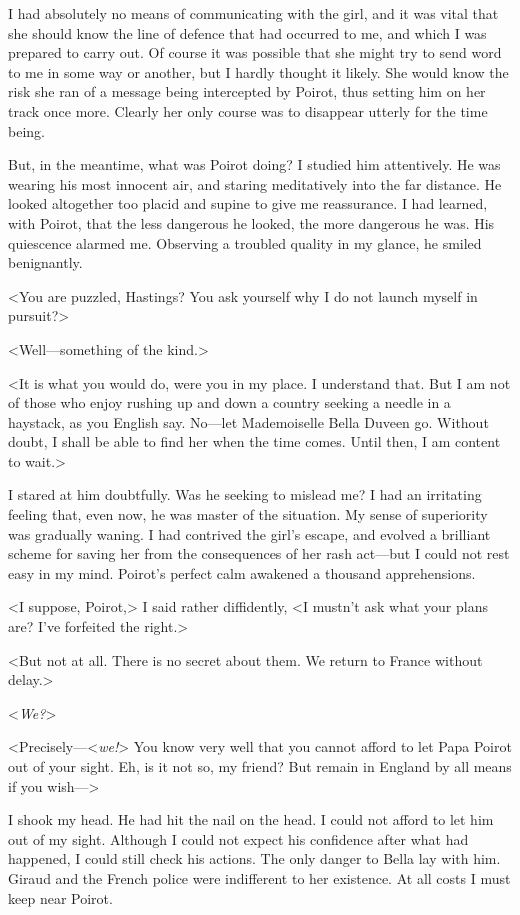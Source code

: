  I had absolutely no means of communicating with the girl, and it was vital that she should know the line of defence that had occurred to me, and which I was prepared to carry out. Of course it was possible that she might try to send word to me in some way or another, but I hardly thought it likely. She would know the risk she ran of a message being intercepted by Poirot, thus setting him on her track once more. Clearly her only course was to disappear utterly for the time being. 

 But, in the meantime, what was Poirot doing? I studied him attentively. He was wearing his most innocent air, and staring meditatively into the far distance. He looked altogether too placid and supine to give me reassurance. I had learned, with Poirot, that the less dangerous he looked, the more dangerous he was. His quiescence alarmed me. Observing a troubled quality in my glance, he smiled benignantly. 

 <You are puzzled, Hastings? You ask yourself why I do not launch myself in pursuit?> 

 <Well—something of the kind.> 

 <It is what you would do, were you in my place. I understand that. But I am not of those who enjoy rushing up and down a country seeking a needle in a haystack, as you English say. No—let Mademoiselle Bella Duveen go. Without doubt, I shall be able to find her when the time comes. Until then, I am content to wait.> 

 I stared at him doubtfully. Was he seeking to mislead me? I had an irritating feeling that, even now, he was master of the situation. My sense of superiority was gradually waning. I had contrived the girl's escape, and evolved a brilliant scheme for saving her from the consequences of her rash act—but I could not rest easy in my mind. Poirot's perfect calm awakened a thousand apprehensions. 

 <I suppose, Poirot,> I said rather diffidently, <I mustn't ask what your plans are? I've forfeited the right.> 

 <But not at all. There is no secret about them. We return to France without delay.> 

 <\emph{We?}> 

 <Precisely—<\emph{we!}> You know very well that you cannot afford to let Papa Poirot out of your sight. Eh, is it not so, my friend? But remain in England by all means if you wish—> 

 I shook my head. He had hit the nail on the head. I could not afford to let him out of my sight. Although I could not expect his confidence after what had happened, I could still check his actions. The only danger to Bella lay with him. Giraud and the French police were indifferent to her existence. At all costs I must keep near Poirot. 

